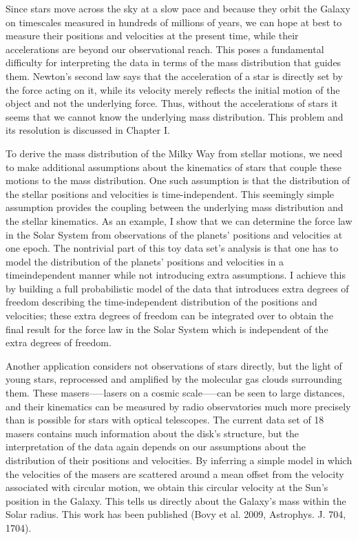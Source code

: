 Since stars move across the sky at a slow pace and because they orbit
the Galaxy on timescales measured in hundreds of millions of years, we
can hope at best to measure their positions and velocities at the
present time, while their accelerations are beyond our observational
reach. This poses a fundamental difficulty for interpreting the data
in terms of the mass distribution that guides them.  Newton’s second
law says that the acceleration of a star is directly set by the force
acting on it, while its velocity merely reflects the initial motion of
the object and not the underlying force. Thus, without the
accelerations of stars it seems that we cannot know the underlying
mass distribution. This problem and its resolution is discussed in
Chapter I.

To derive the mass distribution of the Milky Way from stellar motions,
we need to make additional assumptions about the kinematics of stars
that couple these motions to the mass distribution. One such
assumption is that the distribution of the stellar positions and
velocities is time-independent.  This seemingly simple assumption
provides the coupling between the underlying mass distribution and the
stellar kinematics. As an example, I show that we can determine the
force law in the Solar System from observations of the planets’
positions and velocities at one epoch. The nontrivial part of this toy
data set’s analysis is that one has to model the distribution of the
planets’ positions and velocities in a timeindependent manner while
not introducing extra assumptions. I achieve this by building a full
probabilistic model of the data that introduces extra degrees of
freedom describing the time-independent distribution of the positions
and velocities; these extra degrees of freedom can be integrated over
to obtain the final result for the force law in the Solar System which
is independent of the extra degrees of freedom.

Another application considers not observations of stars directly, but
the light of young stars, reprocessed and amplified by the molecular
gas clouds surrounding them. These masers—--lasers on a cosmic
scale—--can be seen to large distances, and their kinematics can be
measured by radio observatories much more precisely than is possible
for stars with optical telescopes. The current data set of 18 masers
contains much information about the disk’s structure, but the
interpretation of the data again depends on our assumptions about the
distribution of their positions and velocities. By inferring a simple
model in which the velocities of the masers are scattered around a
mean offset from the velocity associated with circular motion, we
obtain this circular velocity at the Sun’s position in the
Galaxy. This tells us directly about the Galaxy’s mass within the
Solar radius. This work has been published (Bovy et al. 2009,
Astrophys. J.  704, 1704). 

